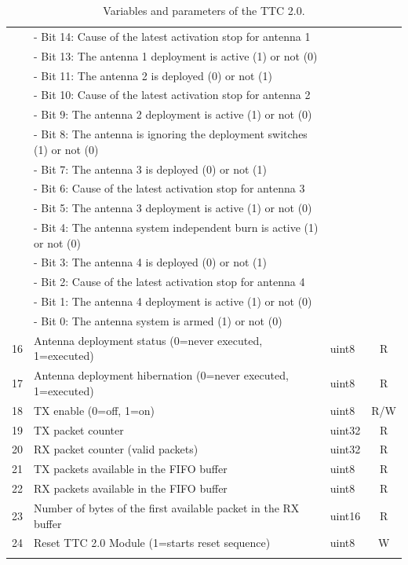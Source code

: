 \begin{longtable}[c]{cL{0.72\textwidth}lc}
        & - Bit 14: Cause of the latest activation stop for antenna 1       &        &   \\
        & - Bit 13: The antenna 1 deployment is active (1) or not (0)       &        &   \\
        & - Bit 11: The antenna 2 is deployed (0) or not (1)                &        &   \\
        & - Bit 10: Cause of the latest activation stop for antenna 2       &        &   \\
        & - Bit 9: The antenna 2 deployment is active (1) or not (0)        &        &   \\
        & - Bit 8: The antenna is ignoring the deployment switches (1) or not (0) &  &   \\
        & - Bit 7: The antenna 3 is deployed (0) or not (1)                 &        &   \\
        & - Bit 6: Cause of the latest activation stop for antenna 3        &        &   \\
        & - Bit 5: The antenna 3 deployment is active (1) or not (0)        &        &   \\
        & - Bit 4: The antenna system independent burn is active (1) or not (0) &    &   \\
        & - Bit 3: The antenna 4 is deployed (0) or not (1)                 &        &   \\
        & - Bit 2: Cause of the latest activation stop for antenna 4        &        &   \\
        & - Bit 1: The antenna 4 deployment is active (1) or not (0)        &        &   \\
        & - Bit 0: The antenna system is armed (1) or not (0)               &        &   \\
    16  & Antenna deployment status (0=never executed, 1=executed)          & uint8  & R \\
    17  & Antenna deployment hibernation (0=never executed, 1=executed)     & uint8  & R \\
    18  & TX enable (0=off, 1=on)                                           & uint8  & R/W \\
    19  & TX packet counter                                                 & uint32 & R \\
    20  & RX packet counter (valid packets)                                 & uint32 & R \\
    21  & TX packets available in the FIFO buffer                           & uint8  & R \\
    22  & RX packets available in the FIFO buffer                           & uint8  & R \\
    23  & Number of bytes of the first available packet in the RX buffer    & uint16 & R \\
    24  & Reset TTC 2.0 Module (1=starts reset sequence)                    & uint8  & W \\
    \bottomrule[1.5pt]
    \caption{Variables and parameters of the TTC 2.0.}
    \label{tab:ttc2-variables}
\end{longtable}


